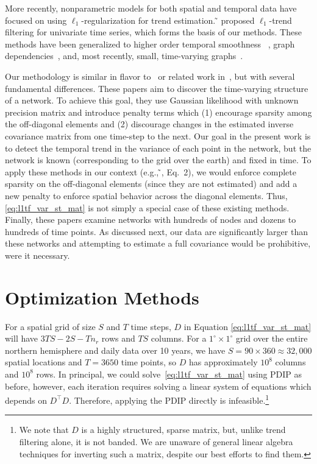 \documentclass[letterpaper]{article} %
\newcommand{\citet}[1]
{\citeauthor{#1} ̃\shortcite{#1}}
\newcommand{\citep}{\cite}
\newcommand{\citealp}[1]
{\citeauthor{#1} ̃\citeyear{#1}}
\begin{document}
More recently, nonparametric models for both spatial and temporal data
have focused on using $\ell_1$-regularization for trend
estimation. \citet{KimKoh2009} proposed $\ell_1$-trend filtering for
univariate time series, which forms the basis of our methods. These
methods have been generalized to higher order temporal smoothness
~\cite{Tibshirani2014}, graph dependencies~\cite{WangSharpnack2016},
and, most recently, small, time-varying
graphs~\cite{HallacPark2017}. 

Our methodology is similar in flavor to~\cite{HallacPark2017} or
related work in~\citep{GibberdNelson2017,MontiHellyer2014}, but with
several fundamental differences. These papers aim to
discover the time-varying structure of a network. To achieve this
goal, they use Gaussian likelihood with unknown precision matrix and
introduce penalty terms which (1) encourage sparsity among the
off-diagonal elements and (2) discourage changes in the estimated inverse
covariance matrix from one time-step to the next.
Our goal in the present work is to detect the temporal trend in the variance of each
point in the network, but the network is known (corresponding to the grid
over the earth) and fixed in time. To apply these methods in our context
(e.g., \citealp{HallacPark2017}, Eq.\ 2), we would
enforce complete sparsity on the off-diagonal elements (since
they are not estimated) and add a new penalty to enforce spatial
behavior across the diagonal elements. Thus, 
\eqref{eq:l1tf_var_st_mat} is not simply a special case of these
existing methods. Finally, these papers examine networks with hundreds
of nodes and dozens to hundreds of time points. As discussed next, our data are
significantly larger than these networks and attempting to estimate a
full covariance would be prohibitive, were it necessary.


\section{Optimization Methods}
\label{sec:prop-optim-meth}

For a spatial grid of size $S$ and $T$ time steps, $D$ in Equation
\eqref{eq:l1tf_var_st_mat} will have 
$3TS-2S-Tn_r$ rows and $TS$ columns. For a $1^\circ\times
1^\circ$ grid over the entire northern hemisphere and daily data over
10 years, we have $S=90\times 360\approx 32,000$ spatial locations and
$T=3650$ time points, so $D$ has
approximately $10^8$ columns and $10^8$ rows. In principal, we could
solve~\eqref{eq:l1tf_var_st_mat} using PDIP as before, however, each iteration
requires solving a linear system of equations which
depends on $D^\top D$. Therefore,
applying the PDIP directly is infeasible.\footnote{We
  note that $D$ is a highly structured, sparse matrix, but, unlike
  trend filtering alone, it is not banded. We are unaware of general
  linear algebra techniques for inverting such a matrix, despite our
  best efforts to find them.}  
\end{document}
